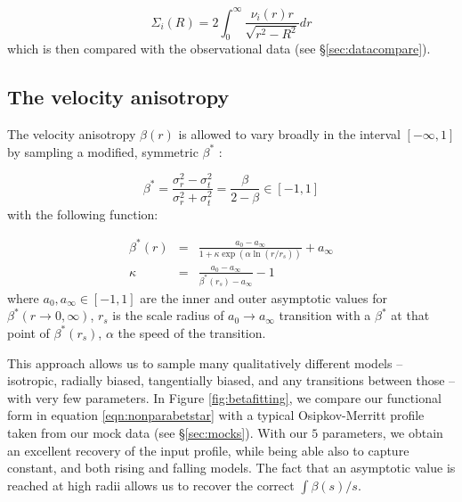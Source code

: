 \begin{equation}
  \Sigma_i(R) = 2\int_0^\infty \frac{\nu_i(r) r}{\sqrt{r^2 - R^2}}dr
\end{equation}
which is then compared with the observational data (see
\S\ref{sec:datacompare}).

\subsection{The velocity anisotropy}

The velocity anisotropy $\beta(r)$ is allowed to vary broadly in the interval
$[-\infty, 1]$ by sampling a modified, symmetric $\beta^*$
\citep[e.g.][]{2006MNRAS.367..387R}:

\begin{equation}\label{eqn:betastar}
    \beta^* = \frac{\sigma_r^2-\sigma_t^2}{\sigma_r^2+\sigma_t^2} = \frac{\beta}{2-\beta} \in [-1,1]
\end{equation}
with the following function:

\begin{eqnarray}
    \beta^*(r) &=& \frac{a_0-a_\infty}{1+\kappa \exp(\alpha\ln(r/r_s))}+a_\infty\\
    \kappa &=& \frac{a_0-a_\infty}{\beta^*(r_s)-a_\infty}-1
    \label{eqn:nonparabetstar}
\end{eqnarray}
where $a_0, a_\infty \in[-1, 1]$ are the inner and outer asymptotic values for
$\beta^*(r\to 0,\infty)$, $r_s$ is the scale radius of $a_0\to a_\infty$
transition with a $\beta^*$ at that point of $\beta^*(r_s)$, $\alpha$ the speed
of the transition.

This approach allows us to sample many qualitatively different models --
isotropic, radially biased, tangentially biased, and any transitions between
those -- with very few parameters. In Figure \ref{fig:betafitting}, we compare
our functional form in equation \ref{eqn:nonparabetstar} with a typical
Osipkov-Merritt profile taken from our mock data (see \S\ref{sec:mocks}). With
our $5$ parameters, we obtain an excellent recovery of the input profile, while
being able also to capture constant, and both rising and falling models. The
fact that an asymptotic value is reached at high radii allows us to recover the
correct $\int \beta(s)/s$.

